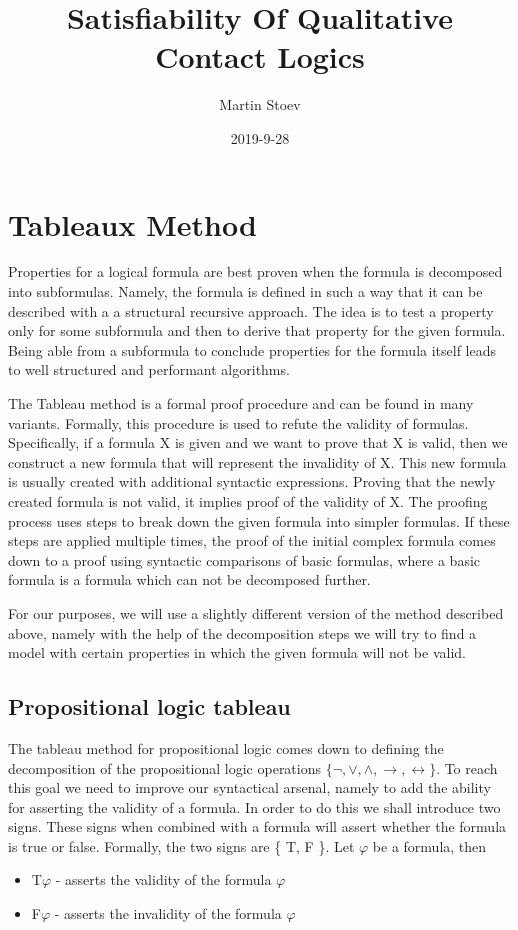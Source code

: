 \documentclass{article}
\title{Satisfiability Of Qualitative Contact Logics}
\date{2019-9-28}
\author{Martin Stoev}
\begin{document}
	\maketitle
	\newpage

	\tableofcontents

	\newpage

	\section{Tableaux Method}
Properties for a logical formula are best proven when the formula is decomposed into subformulas. Namely, the formula is defined in such a way that it can be described with a a structural recursive approach. The idea is to test a property only for some subformula and then to derive that property for the given formula.
Being able from a subformula to conclude properties for the formula itself leads to well structured and performant algorithms.

The Tableau method is a formal proof procedure and can be found in many variants. Formally, this procedure is used to refute the validity of formulas. Specifically, if a formula X is given and we want to prove that X is valid, then we construct a new formula that will represent the invalidity of X. This new formula is usually created with additional syntactic expressions. Proving that the newly created formula is not valid, it implies proof of the validity of X. The proofing process uses steps to break down the given formula into simpler formulas. If these steps are applied multiple times, the proof of the initial complex formula comes down to a proof using syntactic comparisons of basic formulas, where a basic formula is a formula which can not be decomposed further.

For our purposes, we will use a slightly different version of the method described above, namely with the help of the decomposition steps we will try to find a model with certain properties in which the given formula will not be valid.

		\subsection{Propositional logic tableau}
The tableau method for propositional logic comes down to defining the decomposition of the propositional logic operations $\{ \neg, \vee, \wedge, \rightarrow, \leftrightarrow \}$. To reach this goal we need to improve our syntactical arsenal, namely to add the ability for asserting the validity of a formula. In order to do this we shall introduce two signs. These signs when combined with a formula will assert whether the formula is true or false. Formally, the two signs are \{ T, F \}. Let $\varphi$ be a formula, then
\begin{itemize}
	\item T$\varphi$ - asserts the validity of the formula $\varphi$
	\item F$\varphi$ - asserts the invalidity of the formula $\varphi$
\end{itemize} 
\end{document}
